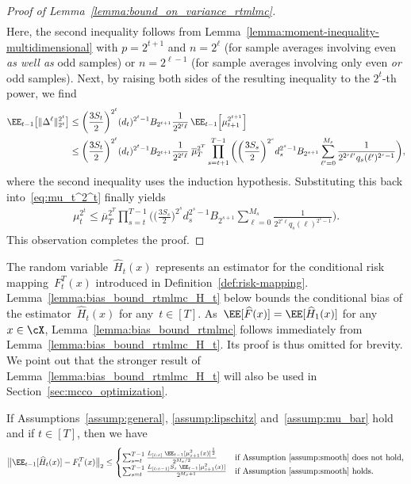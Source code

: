 \documentclass[11pt]{article}
\let\hat\widehat
\begin{document}
\begin{proof}[Proof of Lemma~\ref{lemma:bound_on_variance_rtmlmc}]
\begin{align*}
\end{align*}
Here, the second inequality follows from Lemma~\ref{lemma:moment-inequality-multidimensional} with $p=2^{t+1}$ and $n=2^\ell$ (for sample averages involving even {\em as well as} odd samples) or $n=2^{\ell-1}$ (for sample averages involving only even {\em or} odd samples). Next, by raising both sides of the resulting inequality to the $2^t$-th power, we find
\begin{align*}
    \EE_{t-1}\big[\|\Delta^\ell \|_{2^t}^{2^t}\big] &\leq \bigg(\frac{3S_t}{2}\bigg)^{2^t} (d_t)^{2^{t}-1} B_{2^{t+1}} \frac{1}{2^{2^t\ell}} \, \EE_{t-1}\Big[ \mu_{t+1}^{2^{t+1}} \Big]\\
    &\leq \bigg(\frac{3S_t}{2}\bigg)^{2^t} (d_t)^{2^{t}-1} B_{2^{t+1}} \frac{1}{2^{2^t\ell}}  \; \overline\mu_T^{2^T} \prod_{s=t+1}^{T-1} \bigg(\bigg(\frac{3S_s}{2}\bigg)^{2^s} d_s^{2^s-1} B_{2^{s+1}} \sum_{\ell^\prime=0}^{M_s} \frac{1}{2^{2^s \ell^\prime} q_s(\ell^\prime)^{2^{s}-1}} \bigg),
\end{align*}
where the second inequality uses the induction hypothesis. Substituting this back into~\eqref{eq:mu_t^2^t} finally yields
\begin{align*}
    \mu_t^{2^t} \leq \overline\mu_T^{2^T} \prod_{s=t}^{T-1} \bigg(\bigg(\frac{3S_s}{2}\bigg)^{2^s} d_s^{2^s-1} B_{2^{s+1}} \sum_{\ell=0}^{M_s} \frac{1}{2^{2^s \ell} q_s(\ell)^{2^{s}-1}} \bigg).
\end{align*}
This observation completes the proof.
\end{proof}


The random variable~$\hat{H}_t(x)$ represents an estimator for the conditional risk mapping~$F_t^T(x)$ introduced in Definition~\ref{def:risk-mapping}. Lemma~\ref{lemma:bias_bound_rtmlmc_H_t} below bounds the conditional bias of the estimator~$\hat{H}_t(x)$ for any~$t\in[T]$. As~$\EE[\hat{F}(x)]=\EE[\hat{H}_1(x)]$ for any $x\in\cX$, Lemma~\ref{lemma:bias_bound_rtmlmc} follows immediately from Lemma~\ref{lemma:bias_bound_rtmlmc_H_t}. Its proof is thus omitted for brevity. We point out that the stronger result of Lemma~\ref{lemma:bias_bound_rtmlmc_H_t} will also be used in Section~\ref{sec:mcco_optimization}.


\begin{lemma}
\label{lemma:bias_bound_rtmlmc_H_t} 
If Assumptions~\ref{assump:general}, \ref{assump:lipschitz} and~\ref{assump:mu_bar} hold and if $t\in[T]$, then we have
\begin{align*}
    \big\|\EE_{t-1}[\hat{H}_t(x)] - F_t^T(x)\big\|_2 \leq \begin{cases}
        \sum_{s=t}^{T-1}\frac{L_{[t:s]}\;\EE_{t-1}[\mu_{s+1}^2(x)]^\frac{1}{2}}{2^{M_s/2}}&\text{if Assumption~\ref{assump:smooth} does not hold,}\\
         \sum_{s=t}^{T-1}\frac{L_{[t:s-1]}S_s\;\EE_{t-1}[\mu_{s+1}^{2}(x)]}{2^{M_s + 1}} &\text{if Assumption~\ref{assump:smooth} holds.}
    \end{cases}
\end{align*}
\end{lemma}
\end{document}
